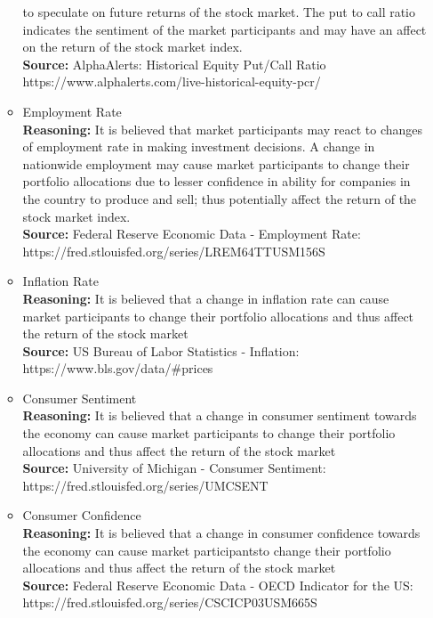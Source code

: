 \begin{itemize}
\begin{itemize}
        to speculate on future returns of the stock market. The put to call ratio indicates the sentiment
        of the market participants and may have an affect on the return of the stock market index.\\
        \textbf{Source:} AlphaAlerts: Historical Equity Put/Call Ratio\\
        https://www.alphalerts.com/live-historical-equity-pcr/
        \item Employment Rate\\
        \textbf{Reasoning:} It is believed that market participants may react to changes of employment
        rate in making investment decisions. A change in nationwide employment may cause market participants
        to change their portfolio allocations due to lesser confidence in ability for companies in the country
        to produce and sell; thus potentially affect the return of the stock market index.\\
        \textbf{Source:} Federal Reserve Economic Data - Employment Rate:\\
        https://fred.stlouisfed.org/series/LREM64TTUSM156S
        \item Inflation Rate\\
        \textbf{Reasoning:} It is believed that a change in inflation rate can cause market participants
        to change their portfolio allocations and thus affect the return of the stock market\\
        \textbf{Source:} US Bureau of Labor Statistics - Inflation:\\
        https://www.bls.gov/data/\#prices
        \item Consumer Sentiment\\
        \textbf{Reasoning:} It is believed that a change in consumer sentiment towards the economy
        can cause market participants to change their portfolio allocations and thus affect the
        return of the stock market\\
        \textbf{Source:} University of Michigan - Consumer Sentiment:\\
        https://fred.stlouisfed.org/series/UMCSENT
        \item Consumer Confidence\\
        \textbf{Reasoning:} It is believed that a change in consumer confidence towards the economy
        can cause market participantsto change their portfolio allocations and thus affect the return
        of the stock market\\
        \textbf{Source:} Federal Reserve Economic Data - OECD Indicator for the US:\\
        https://fred.stlouisfed.org/series/CSCICP03USM665S
    \end{itemize}
\end{itemize}


